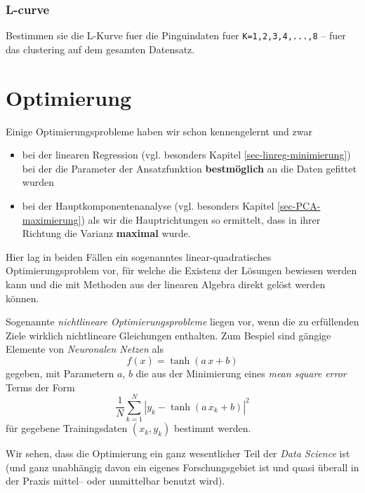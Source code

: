 \documentclass[]{book}
\providecommand{\tightlist}{%
  \setlength{\itemsep}{0pt}\setlength{\parskip}{0pt}}
\theoremstyle{definition}
\theoremstyle{definition}
\theoremstyle{definition}
\theoremstyle{definition}
\theoremstyle{remark}
\begin{document}
\hypertarget{l-curve}{%
\subsection{L-curve}\label{l-curve}}

Bestimmen sie die L-Kurve fuer die Pinguindaten fuer \texttt{K=1,2,3,4,...,8} -- fuer das clustering auf dem gesamten Datensatz.

\hypertarget{optimierung}{%
\chapter{Optimierung}\label{optimierung}}

\providecommand{\diva}[1]{\mathrm{d} #1}

Einige Optimierungsprobleme haben wir schon kennengelernt und zwar

\begin{itemize}
\tightlist
\item
  bei der linearen Regression (vgl. besonders Kapitel \ref{sec-linreg-minimierung}) bei der die Parameter der Ansatzfunktion \textbf{bestmöglich} an die Daten gefittet wurden
\item
  bei der Hauptkomponentenanalyse (vgl. besonders Kapitel \ref{sec-PCA-maximierung}) als wir die Hauptrichtungen so ermittelt, dass in ihrer Richtung die Varianz \textbf{maximal} wurde.
\end{itemize}

Hier lag in beiden Fällen ein sogenanntes linear-quadratisches Optimierungsproblem vor, für welche die Existenz der Lösungen bewiesen werden kann und die mit Methoden aus der linearen Algebra direkt gelöst werden können.

Sogenannte \emph{nichtlineare Optimierungsprobleme} liegen vor, wenn die zu erfüllenden Ziele wirklich nichtlineare Gleichungen enthalten. Zum Bespiel sind gängige Elemente von \emph{Neuronalen Netzen} als
\begin{equation*}
f(x) = \tanh(a\, x + b)
\end{equation*}
gegeben, mit Parametern \(a\), \(b\) die aus der Minimierung eines \emph{mean square error} Terms der Form
\begin{equation*}
\frac 1N \sum_{k=1}^N|y_k - \tanh(a\, x_k + b)|^2
\end{equation*}
für gegebene Trainingsdaten \((x_k, y_k)\) bestimmt werden.

Wir sehen, dass die Optimierung ein ganz wesentlicher Teil der \emph{Data Science} ist (und ganz unabhängig davon ein eigenes Forschungsgebiet ist und quasi überall in der Praxis mittel-- oder unmittelbar benutzt wird).
\end{document}
